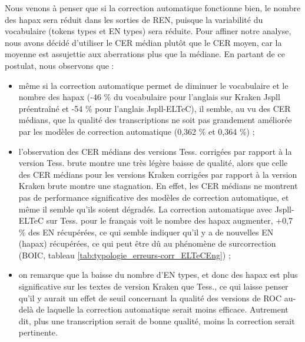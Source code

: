 Nous venons à penser que si la correction automatique fonctionne bien, le nombre des hapax sera réduit dans les sorties de REN, puisque la variabilité du vocabulaire (tokens types et EN types) sera réduite. Pour affiner notre analyse, nous avons décidé d'utiliser le CER médian plutôt que le CER moyen, car la moyenne est assujettie aux aberrations plus que la médiane. En partant de ce postulat, nous observons que :
\begin{itemize}

\item même si la correction automatique permet de diminuer le vocabulaire et le nombre des hapax (-46 \% du vocabulaire pour l'anglais sur Kraken Jspll préentraîné et -54 \% pour l'anglais Jspll-ELTeC), il semble, au vu des CER médians, que la qualité des transcriptions ne soit pas grandement améliorée par les modèles de correction automatique (0,362 \% et 0,364 \%) ;
\item l'observation des CER médians des versions Tess. corrigées par rapport à la version Tess. brute montre une très légère baisse de qualité, alors que celle des CER médians pour les versions Kraken corrigées par rapport à la version Kraken brute montre une stagnation. En effet, les CER médians ne montrent pas de performance significative des modèles de correction automatique, et même il semble qu'ils soient dégradés. La correction automatique avec Jspll-ELTeC sur Tess. pour le français voit le nombre des hapax augmenter, +0,7 \% des EN récupérées, ce qui semble indiquer qu'il y a de nouvelles EN (hapax) récupérées, ce qui peut être dû au phénomène de surcorrection (BOIC, tableau \ref{tab:typologie_erreurs-corr_ELTeCEng}) ;
\item on remarque que la baisse du nombre d'EN types, et donc des hapax est plus significative sur les textes de version Kraken que Tess., ce qui laisse penser qu'il y aurait un effet de seuil concernant la qualité des versions de ROC au-delà de laquelle la correction automatique serait moins efficace. Autrement dit, plus une transcription serait de bonne qualité, moins la correction serait pertinente.
\end{itemize}


